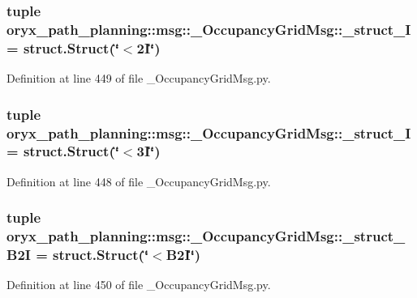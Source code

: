 \subsubsection[{\-\_\-struct\-\_\-2\-I}]{\setlength{\rightskip}{0pt plus 5cm}tuple {\bf oryx\-\_\-path\-\_\-planning\-::msg\-::\-\_\-\-Occupancy\-Grid\-Msg\-::\-\_\-struct\-\_\-I} = struct.\-Struct(\char`\"{}$<$2\-I\char`\"{})}\label{namespaceoryx__path__planning_1_1msg_1_1__OccupancyGridMsg_a291d765741d0da3fe4cab0aa2c445ef1}


\-Definition at line 449 of file \-\_\-\-Occupancy\-Grid\-Msg.\-py.

\subsubsection[{\-\_\-struct\-\_\-3\-I}]{\setlength{\rightskip}{0pt plus 5cm}tuple {\bf oryx\-\_\-path\-\_\-planning\-::msg\-::\-\_\-\-Occupancy\-Grid\-Msg\-::\-\_\-struct\-\_\-I} = struct.\-Struct(\char`\"{}$<$3\-I\char`\"{})}\label{namespaceoryx__path__planning_1_1msg_1_1__OccupancyGridMsg_adae82f2fb01a6b46bba40885b5d52e44}


\-Definition at line 448 of file \-\_\-\-Occupancy\-Grid\-Msg.\-py.

\subsubsection[{\-\_\-struct\-\_\-\-B2\-I}]{\setlength{\rightskip}{0pt plus 5cm}tuple {\bf oryx\-\_\-path\-\_\-planning\-::msg\-::\-\_\-\-Occupancy\-Grid\-Msg\-::\-\_\-struct\-\_\-\-B2\-I} = struct.\-Struct(\char`\"{}$<$\-B2\-I\char`\"{})}\label{namespaceoryx__path__planning_1_1msg_1_1__OccupancyGridMsg_ad63788150a3b69497ed84c97bca8c8ce}


\-Definition at line 450 of file \-\_\-\-Occupancy\-Grid\-Msg.\-py.

